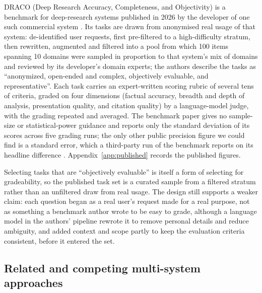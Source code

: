 \documentclass[11pt]{article}
\begin{document}
DRACO (Deep Research Accuracy, Completeness, and Objectivity) is a benchmark for
deep-research systems published in 2026 by the developer of one such commercial system
\citep{draco2026, draco2026dataset}. Its tasks are drawn from anonymised real usage of
that system: de-identified user requests, first pre-filtered to a high-difficulty
stratum, then rewritten, augmented and filtered into a pool from which 100 items spanning 10
domains were sampled in proportion to that system's mix of domains and reviewed by its developer's domain experts; the authors describe the tasks as ``anonymized, open-ended and complex, objectively
evaluable, and representative''. Each task carries an expert-written scoring
rubric of several tens of criteria, graded on four dimensions (factual accuracy, breadth
and depth of analysis, presentation quality, and citation quality) by a language-model
judge, with the grading repeated and averaged. The benchmark paper gives no sample-size
or statistical-power guidance and reports only the standard deviation of its scores across five grading runs; the only other public precision figure we could find is a
standard error, which a third-party run of the benchmark reports on its headline difference
\citep{msftdraco2026}. Appendix~\ref{app:published} records the published figures.

Selecting tasks that are ``objectively evaluable'' is itself a form of selecting for gradeability, so the published task set is a curated sample from a filtered stratum rather than an unfiltered draw from real usage. The design still supports a weaker claim: each question began as a real user's request made for a real purpose, not as something a benchmark author wrote to be easy to grade, although a language model in the authors' pipeline rewrote it to remove personal details and reduce ambiguity, and added context and scope partly to keep the evaluation criteria consistent, before it entered the set.

\subsection{Related and competing multi-system approaches}
\label{sec:related}
\end{document}
